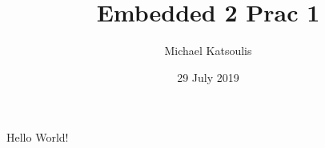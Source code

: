 \documentclass{article}
\title{Embedded 2 Prac 1}
\date{29 July 2019}
\author{Michael Katsoulis}
\begin{document}
  \maketitle
  \newpage

  Hello World!
\end{document}
